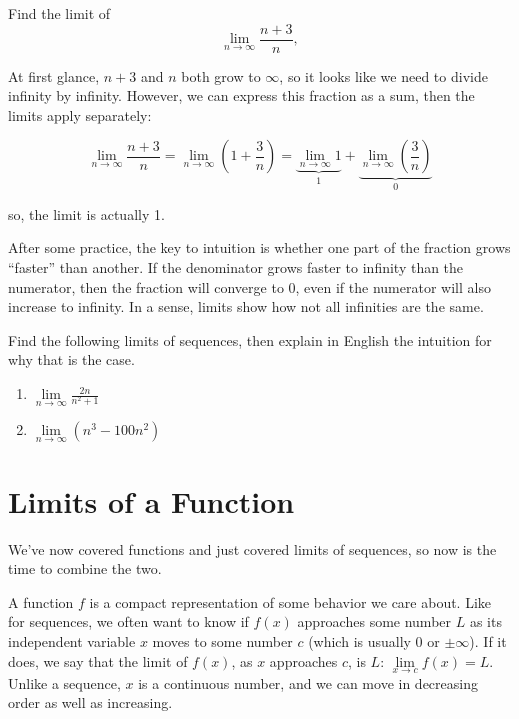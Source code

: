 \documentclass[]{book}
\providecommand{\tightlist}{%
  \setlength{\itemsep}{0pt}\setlength{\parskip}{0pt}}
\theoremstyle{definition}
\theoremstyle{definition}
\theoremstyle{definition}
\theoremstyle{remark}
\let\BeginKnitrBlock\begin \let\EndKnitrBlock\end
\begin{document}
\BeginKnitrBlock{example}[Simplifying a Fraction into Sums]
\protect\hypertarget{exm:unnamed-chunk-3}{}{\label{exm:unnamed-chunk-3} {} }Find the limit of
\[\lim_{n\to \infty} \frac{n + 3}{n},\]
\EndKnitrBlock{example}

\BeginKnitrBlock{solution}
{}At first glance, \(n + 3\) and \(n\) both grow to \(\infty\), so it looks like we need to divide infinity by infinity. However, we can express this fraction as a sum, then the limits apply separately:

\[\lim_{n\to \infty} \frac{n + 3}{n} = \lim_{n\to \infty} \left(1 + \frac{3}{n}\right) =  \underbrace{\lim_{n\to \infty}1}_{1} +  \underbrace{\lim_{n\to \infty}\left(\frac{3}{n}\right)}_{0}\]

so, the limit is actually 1.
\EndKnitrBlock{solution}

After some practice, the key to intuition is whether one part of the fraction grows ``faster'' than another. If the denominator grows faster to infinity than the numerator, then the fraction will converge to 0, even if the numerator will also increase to infinity. In a sense, limits show how not all infinities are the same.

\BeginKnitrBlock{exercise}
\protect\hypertarget{exr:limseq2}{}{\label{exr:limseq2} }Find the following limits of sequences, then explain in English the intuition for why that is the case.

\begin{enumerate}
\def\labelenumi{\arabic{enumi}.}
\tightlist
\item
  \(\lim\limits_{n\to\infty} \frac{2n}{n^2 + 1}\)
\item
  \(\lim\limits_{n\to\infty} (n^3 - 100n^2)\)
\end{enumerate}
\EndKnitrBlock{exercise}

\hypertarget{limitsfun}{%
\section{Limits of a Function}\label{limitsfun}}

We've now covered functions and just covered limits of sequences, so now is the time to combine the two.

A function \(f\) is a compact representation of some behavior we care about. Like for sequences, we often want to know if \(f(x)\) approaches some number \(L\) as its independent variable \(x\) moves to some number \(c\) (which is usually 0 or \(\pm\infty\)). If it does, we say that the limit of \(f(x)\), as \(x\) approaches \(c\), is \(L\): \(\lim\limits_{x \to c} f(x)=L\). Unlike a sequence, \(x\) is a continuous number, and we can move in decreasing order as well as increasing.
\end{document}
